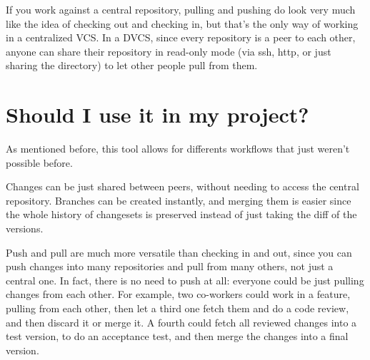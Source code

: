 \documentclass[%
	final,
	notitlepage,
	narroweqnarray,
	inline,
	twoside,
	]{ieee}
\begin{document}
If you work against a central repository, pulling and pushing do look very much like
the idea of checking out and checking in, but that's the only way of working in a centralized VCS.
In a DVCS, since every repository is a peer to each other, anyone can share their repository in 
read-only mode (via ssh, http, or just sharing the directory) to let other people pull from them. 




\section{Should I use it in my project?}

As mentioned before, this tool allows for differents workflows that just weren't 
possible before.

Changes can be just shared between peers, without needing to access the central 
repository. Branches can be created instantly, and merging them is easier since 
the whole history of changesets is preserved instead of just taking the diff of 
the versions.

Push and pull are much more versatile than checking in and out, since you can push 
changes into many repositories and pull from many others, not just a central one.
In fact, there is no need to push at all:
everyone could be just pulling changes from each other. For example, two co-workers could work 
in a feature, pulling from each other, then let a third one fetch them and do a code review, and then 
discard it or merge it. A fourth could fetch all reviewed changes into a test version, to do an 
acceptance test, and then merge the changes into a final version.
\end{document}
